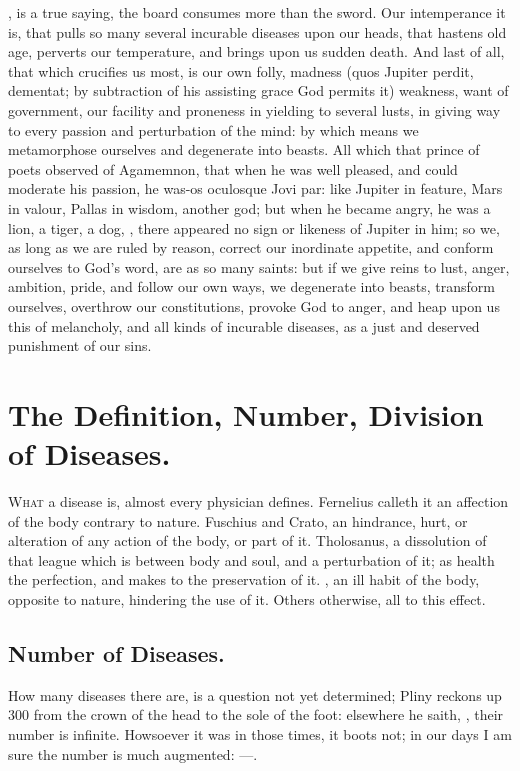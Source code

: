 {, is a true saying, the board consumes more
than the sword. Our intemperance it is, that pulls so many several
incurable diseases upon our heads, that hastens old age, perverts
our temperature, and brings upon us sudden death. And last of all, that
which crucifies us most, is our own folly, madness (quos Jupiter
perdit, dementat; by subtraction of his assisting grace God permits it)
weakness, want of government, our facility and proneness in yielding to
several lusts, in giving way to every passion and perturbation of the
mind: by which means we metamorphose ourselves and degenerate into
beasts. All which that prince of poets observed of Agamemnon, that
when he was well pleased, and could moderate his passion, he was-os
oculosque Jovi par: like Jupiter in feature, Mars in valour, Pallas in
wisdom, another god; but when he became angry, he was a lion, a tiger,
a dog, \etc{}, there appeared no sign or likeness of Jupiter in him; so
we, as long as we are ruled by reason, correct our inordinate appetite,
and conform ourselves to God's word, are as so many saints: but if we
give reins to lust, anger, ambition, pride, and follow our own ways, we
degenerate into beasts, transform ourselves, overthrow our
constitutions, provoke God to anger, and heap upon us this of
melancholy, and all kinds of incurable diseases, as a just and deserved
punishment of our sins.

\section{The Definition, Number, Division of Diseases.}

\lettrine{W}{hat} a disease is, almost every physician defines. Fernelius
calleth it an affection of the body contrary to nature. Fuschius
and Crato, an hindrance, hurt, or alteration of any action of the body,
or part of it. Tholosanus, a dissolution of that league which is
between body and soul, and a perturbation of it; as health the
perfection, and makes to the preservation of it. , an ill habit of the body, opposite to nature, hindering the
use of it. Others otherwise, all to this effect.

\subsection{Number of Diseases.}
How many diseases there are, is a question not
yet determined; Pliny reckons up 300 from the crown of the head to
the sole of the foot: elsewhere he saith, ,
their number is infinite. Howsoever it was in those times, it boots
not; in our days I am sure the number is much augmented:
---.

}
